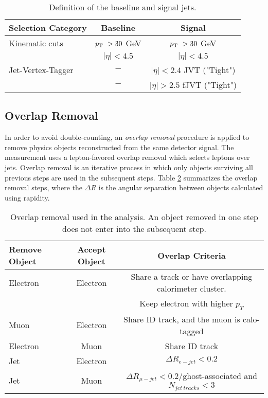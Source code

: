 \begin{table}[ht]
    \centering
    \caption{Definition of the baseline and signal jets.\label{tab:jets}}
        \begin{tabular}{|| l || c | c ||}
        \hline
        Selection Category & \textbf{Baseline} & \textbf{Signal} \\
        \hline\hline
        Kinematic cuts & $p_{\textrm{T} ~} > 30$ GeV & $p_{\textrm{T} ~} > 30$ GeV \\
             & $|\eta| < 4.5$ & $|\eta| < 4.5$\\
        \hline
        Jet-Vertex-Tagger & $-$ & $ |\eta| < 2.4 $ JVT ("Tight")\\
                & $-$ & $|\eta| > 2.5 $ fJVT ("Tight")\\
        \hline
    \end{tabular}
\end{table}

\subsection{Overlap Removal}
\label{subsec:OR}

In order to avoid double-counting, an \textit{overlap removal} procedure is applied to remove physics objects reconstructed from the same detector signal. The measurement uses a lepton-favored overlap removal which selects leptons over jets. Overlap removal is an iterative process in which only objects surviving all previous steps are used in the subsequent steps. Table \ref{tab:overlap_removal} summarizes the overlap removal steps, where the $\Delta R$ is the angular separation between objects calculated using rapidity.

\begin{table}[ht]
    \centering
        \caption{Overlap removal used in the analysis. An object removed in one step does not enter into the subsequent step. \label{tab:overlap_removal}}
        \begin{tabular}{|| l || c | c ||}
        \hline
        Remove Object & Accept Object & Overlap Criteria \\
        \hline\hline
        Electron & Electron & Share a track or have overlapping calorimeter cluster.\\
                &       & Keep electron with higher $p_{T}$\\
        \hline
        Muon & Electron & Share ID track, and the muon is calo-tagged\\
        \hline
        Electron & Muon & Share ID track\\
        \hline
        Jet & Electron & $\Delta R_{e-jet} < 0.2$ \\
        \hline 
        Jet & Muon & $\Delta R_{\mu-jet} < 0.2/$ghost-associated and $N_{jet~tracks} < 3$\\
        \hline
    \end{tabular}
\end{table}